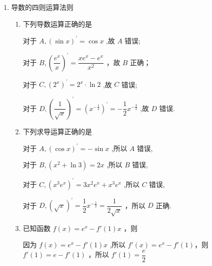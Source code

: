 \begin{enumerate}
\begin{enumerate}
    \end{enumerate}

    \item 导数的四则运算法则
    \begin{enumerate}
        \item 下列导数运算正确的是
        \begin{jieda}
            对于 ${A},{\left( \sin x\right) }^{\prime } = \cos x$ ,故 ${A}$ 错误;
            
            对于 ${B},{\left( \dfrac{{{e}}^{x}}{x}\right) }^{\prime } = \dfrac{x{{e}}^{x} - {{e}}^{x}}{{x}^{2}}$ ，故 ${B}$ 正确；
            
            对于 ${C},{\left( {2}^{x}\right) }^{\prime } = {2}^{x} \cdot  \ln 2$ ,故 ${C}$ 错误;
            
            对于 ${D},{\left( \dfrac{1}{\sqrt{x}}\right) }^{\prime } = {\left( {x}^{-\frac{1}{2}}\right) }^{\prime } =  - \dfrac{1}{2}{x}^{-\frac{3}{2}}$ ,故 ${D}$ 错误.

        \end{jieda}

        \item 下列求导运算正确的是

        \begin{jieda}
            对于 ${A},{\left( \cos x\right) }^{\prime } =  - \sin x$ ,所以 ${A}$ 错误,
            
            对于 ${B},\left( {{x}^{2} + \ln 3}\right)  = {2x}$ ,所以 ${B}$ 错误,
            
            对于 ${C},{\left( {x}^{3}{{e}}^{x}\right) }^{\prime } = 3{x}^{2}{{e}}^{x} + {x}^{3}{{e}}^{x}$ ,所以 ${C}$ 错误,
            
            对于 ${D},{\left( \sqrt{x}\right) }^{\prime } = \dfrac{1}{2}{x}^{-\frac{1}{2}} = \dfrac{1}{2\sqrt{x}}$ ，所以 ${D}$ 正确.
        \end{jieda}
        
        \item 已知函数 $f\left( x\right)  = {{e}}^{x} - f'\left( 1\right) x$ ，则
        \begin{jieda}
            因为 $f\left( x\right)  = {{e}}^{x} - f'\left( 1\right) x$ ,所以 $f'\left( x\right)  = {{e}}^{x} - f'\left( 1\right)$，则 $f'\left( 1\right)  = {e} - f'\left( 1\right)$ ，所以 $f'\left( 1\right)  = \dfrac{{e}}{2}$
            

\end{jieda}
\end{enumerate}
\end{enumerate}
